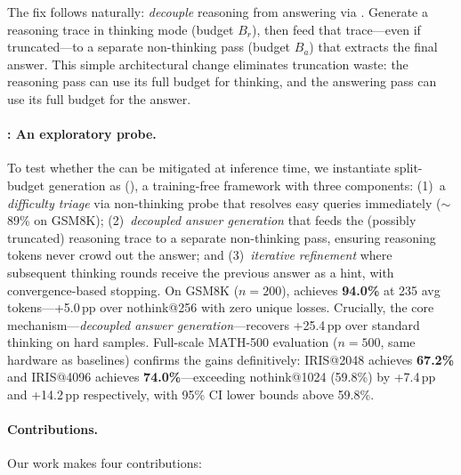 The fix follows naturally: \emph{decouple} reasoning from answering via \splitbudget{}.
Generate a reasoning trace in thinking mode (budget $B_r$), then feed that trace---even if truncated---to a separate non-thinking pass (budget $B_a$) that extracts the final answer.
This simple architectural change eliminates truncation waste: the reasoning pass can use its full budget for thinking, and the answering pass can use its full budget for the answer.

\paragraph{\method{}: An exploratory probe.}
To test whether the \couplingtax{} can be mitigated at inference time, we instantiate split-budget generation as \method{} (\fullmethod{}), a training-free framework with three components:
(1)~a \emph{difficulty triage} via non-thinking probe that resolves easy queries immediately (${\sim}$89\% on GSM8K);
(2)~\emph{decoupled answer generation} that feeds the (possibly truncated) reasoning trace to a separate non-thinking pass, ensuring reasoning tokens never crowd out the answer; and
(3)~\emph{iterative refinement} where subsequent thinking rounds receive the previous answer as a hint, with convergence-based stopping.
On GSM8K ($n{=}200$), \method{} achieves \textbf{94.0\%} at 235 avg tokens---+5.0\,pp over nothink@256 with zero unique losses.
Crucially, the core mechanism---\emph{decoupled answer generation}---recovers +25.4\,pp over standard thinking on hard samples.
Full-scale MATH-500 evaluation ($n{=}500$, same hardware as baselines) confirms the gains definitively: IRIS@2048 achieves \textbf{67.2\%} and IRIS@4096 achieves \textbf{74.0\%}---exceeding nothink@1024 (59.8\%) by +7.4\,pp and +14.2\,pp respectively, with 95\% CI lower bounds above 59.8\%.

\paragraph{Contributions.}
Our work makes four contributions:

